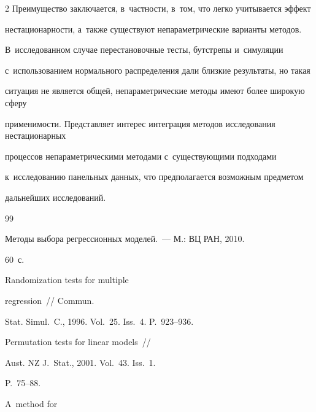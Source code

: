 \begin{multicols}{2}
Преимущество заключается, в~част\-ности, в~том, что легко учитывается эффект 


нестационарности, а~также существуют \mbox{непараметрические} варианты методов. 


В~исследованном случае перестановочные тесты, бутстрепы и~симуляции 


с~\mbox{использованием} нормального распределения дали близкие результаты, но такая 


ситуация не является общей, непараметрические методы имеют более широкую сферу 


применимости. Представляет интерес интеграция методов исследования нестационарных 


процессов непараметрическими методами с~существующими подходами 


к~исследованию панельных данных, что предполагается возможным предметом 


дальнейших исследований.


  


{\small\frenchspacing


 {%




 \begin{thebibliography}{99}


  




   Методы выбора регрессионных моделей.~--- М.: ВЦ РАН, 2010. 


60~с.




   Randomization tests for multiple 


  regression~// Commun. 


Stat. Simul.~C., 1996. Vol.~25. Iss.~4. P.~923--936.




   Permutation tests for linear models~// 


  Aust. NZ J.~Stat., 2001. Vol.~43. Iss.~1.  


P.~75--88.




   A~method for 



\end{thebibliography}}}
\end{multicols}
